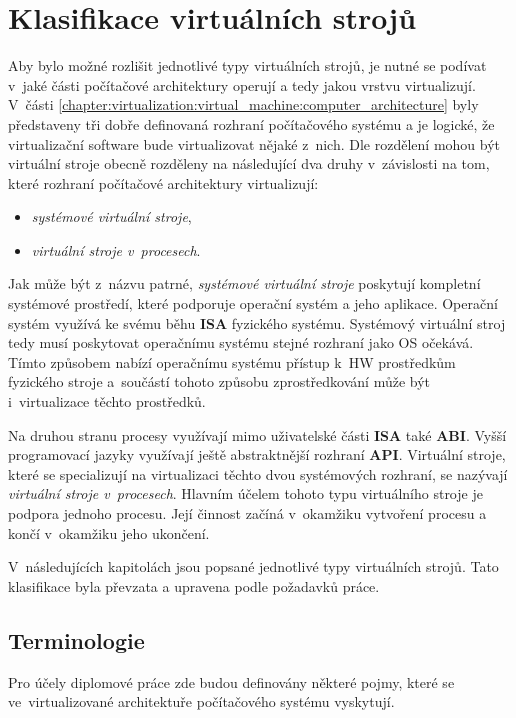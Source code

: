 \section{Klasifikace virtuálních strojů}
\label{chapter:virtualization:clasification}
Aby bylo možné rozlišit jednotlivé typy virtuálních strojů, je nutné se podívat v~jaké části počítačové architektury operují
a tedy jakou vrstvu virtualizují. V~části \ref{chapter:virtualization:virtual_machine:computer_architecture} byly představeny 
tři dobře definovaná rozhraní počítačového systému a je logické, že virtualizační software bude virtualizovat nějaké z~nich.
Dle rozdělení \cite{book:iee:vm_architecture} mohou být virtuální stroje obecně rozděleny na následující dva druhy v~závislosti
na tom, které rozhraní počítačové architektury virtualizují:
\begin{itemize}
  \item \textit{systémové virtuální stroje},
  \item \textit{virtuální stroje v~procesech}.
\end{itemize}
Jak může být z~názvu patrné, \textit{systémové virtuální stroje} poskytují kompletní systémové prostředí, které podporuje
operační systém a jeho aplikace. Operační systém využívá ke svému běhu \textbf{ISA} fyzického systému. Systémový virtuální
stroj tedy musí poskytovat operačnímu systému stejné rozhraní jako OS očekává. Tímto způsobem nabízí operačnímu systému
přístup k~HW prostředkům fyzického stroje a~součástí tohoto způsobu zprostředkování může být i~virtualizace těchto prostředků.

Na druhou stranu procesy využívají mimo uživatelské části \textbf{ISA} také \textbf{ABI}. Vyšší programovací jazyky využívají
ještě abstraktnější rozhraní \textbf{API}. Virtuální stroje, které se specializují na virtualizaci těchto dvou systémových 
rozhraní, se nazývají \textit{virtuální stroje v~procesech}. Hlavním účelem tohoto typu virtuálního stroje je podpora jednoho
procesu. Její činnost začíná v~okamžiku vytvoření procesu a končí v~okamžiku jeho ukončení.

V~následujících kapitolách jsou popsané jednotlivé typy virtuálních strojů. Tato klasifikace \cite{book:iee:vm_architecture}
byla převzata a upravena podle požadavků práce.
\subsection{Terminologie}
\label{chapter:virtualization:clasification:terms}
Pro účely diplomové práce zde budou definovány některé pojmy, které se ve~virtualizované architektuře počítačového systému vyskytují. 

